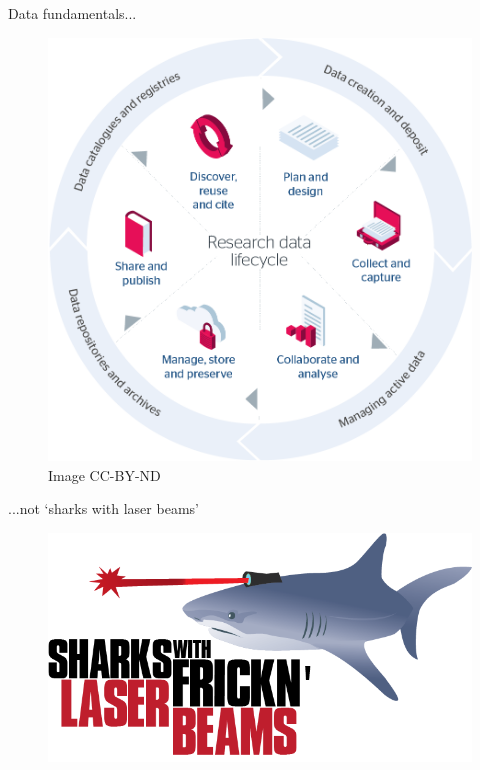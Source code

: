 \documentclass[aspectratio=169, 11pt]{beamer} %
\begin{document}
\begin{frame}{Data fundamentals...}
 \begin{figure}[H]
    \centering
        \includegraphics[height=.75\textheight]{figures/research-data-life-diagram.png}
        \caption{\cite{Jisc2018-gx} Image CC-BY-ND}
        \label{fig:figure9}
 \end{figure}
\end{frame}

\begin{frame}{...not `sharks with laser beams'}
 \begin{figure}[H]
    \centering
        \includegraphics[height=.75\textheight]{figures/Sharks-Lasers.png}
        \label{fig:sharks}
 \end{figure}
\end{frame}
\end{document}
